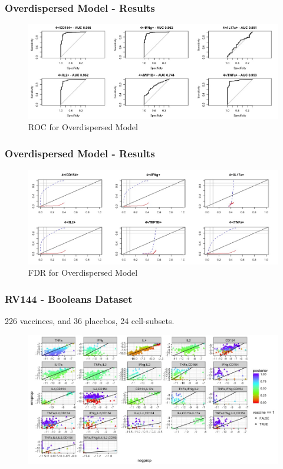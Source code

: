 \documentclass{beamer}
\theoremstyle{definition}
\begin{document}

\begin{frame}
\frametitle{Overdispersed Model - Results}
\begin{figure}[]
\includegraphics[width=12 cm]{figures/marginalBBroc} \caption{ROC for Overdispersed Model}
\end{figure}
\end{frame}


\begin{frame}
\frametitle{Overdispersed Model - Results}
\begin{figure}[]
\includegraphics[width=12 cm]{figures/marginalBBfdr} \caption{FDR for Overdispersed Model}
\end{figure}
\end{frame}


\begin{frame}
\frametitle{RV144 - Booleans Dataset}
226 vaccinees, and 36 placebos, 24 cell-subsets.
\begin{figure}[]
\includegraphics[width=13.2 cm]{figures/booleansFullScatter}
\end{figure}
\end{frame}
\end{document}
